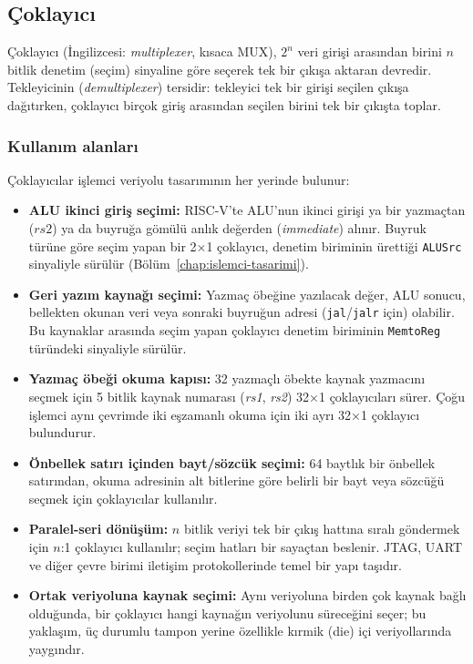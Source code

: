 \subsection{Çoklayıcı}

Çoklayıcı (İngilizcesi: \emph{multiplexer}, kısaca MUX), $2^n$ veri girişi arasından birini $n$ bitlik denetim (seçim) sinyaline göre seçerek tek bir çıkışa aktaran devredir. Tekleyicinin (\emph{demultiplexer}) tersidir: tekleyici tek bir girişi seçilen çıkışa dağıtırken, çoklayıcı birçok giriş arasından seçilen birini tek bir çıkışta toplar.

\subsubsection{Kullanım alanları}
Çoklayıcılar işlemci veriyolu tasarımının her yerinde bulunur:
\begin{itemize}
  \item \textbf{ALU ikinci giriş seçimi:} RISC-V'te ALU'nun ikinci girişi ya bir yazmaçtan ($rs2$) ya da buyruğa gömülü anlık değerden (\emph{immediate}) alınır. Buyruk türüne göre seçim yapan bir 2×1 çoklayıcı, denetim biriminin ürettiği \texttt{ALUSrc} sinyaliyle sürülür (Bölüm~\ref{chap:islemci-tasarimi}).
  \item \textbf{Geri yazım kaynağı seçimi:} Yazmaç öbeğine yazılacak değer, ALU sonucu, bellekten okunan veri veya sonraki buyruğun adresi (\texttt{jal}/\texttt{jalr} için) olabilir. Bu kaynaklar arasında seçim yapan çoklayıcı denetim biriminin \texttt{MemtoReg} türündeki sinyaliyle sürülür.
  \item \textbf{Yazmaç öbeği okuma kapısı:} 32 yazmaçlı öbekte kaynak yazmacını seçmek için 5 bitlik kaynak numarası (\emph{rs1}, \emph{rs2}) 32×1 çoklayıcıları sürer. Çoğu işlemci aynı çevrimde iki eşzamanlı okuma için iki ayrı 32×1 çoklayıcı bulundurur.
  \item \textbf{Önbellek satırı içinden bayt/sözcük seçimi:} 64 baytlık bir önbellek satırından, okuma adresinin alt bitlerine göre belirli bir bayt veya sözcüğü seçmek için çoklayıcılar kullanılır.
  \item \textbf{Paralel-seri dönüşüm:} $n$ bitlik veriyi tek bir çıkış hattına sıralı göndermek için $n$:1 çoklayıcı kullanılır; seçim hatları bir sayaçtan beslenir. JTAG, UART ve diğer çevre birimi iletişim protokollerinde temel bir yapı taşıdır.
  \item \textbf{Ortak veriyoluna kaynak seçimi:} Aynı veriyoluna birden çok kaynak bağlı olduğunda, bir çoklayıcı hangi kaynağın veriyolunu süreceğini seçer; bu yaklaşım, üç durumlu tampon yerine özellikle kırmik (die) içi veriyollarında yaygındır.
\end{itemize}


